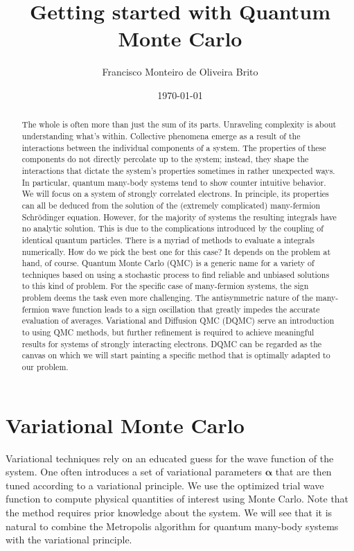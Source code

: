 \documentclass[10pt]{article}
\begin{document}
\title{Getting started with Quantum Monte Carlo}
\author{Francisco Monteiro de Oliveira Brito}
\date{\today}
\maketitle

\begin{abstract}
The whole is often more than just the sum of its parts. Unraveling complexity is about understanding what's within. Collective phenomena emerge as a result of the interactions between the individual components of a system. The properties of these components do not directly percolate up to the system; instead, they shape the interactions that dictate the system's properties sometimes in rather  unexpected ways. In particular, quantum many-body systems tend to show counter intuitive behavior. We will focus on a system of strongly correlated electrons. In principle, its properties can all be deduced from the solution of the (extremely complicated) many-fermion Schr\"odinger equation. However, for the majority of systems the resulting integrals have no analytic solution. This is due to the complications introduced by the coupling of identical quantum particles. There is a myriad of methods to evaluate a integrals numerically. How do we pick the best one for this case? It depends on the problem at hand, of course. Quantum Monte Carlo (QMC) is a generic name for a variety of techniques based on using a stochastic process to find reliable and unbiased solutions to this kind of problem. For the specific case of many-fermion systems, the sign problem deems the task even more challenging. The antisymmetric nature of the many-fermion wave function leads to a sign oscillation that greatly impedes the accurate evaluation of averages. Variational and Diffusion QMC (DQMC) serve an introduction to using QMC methods, but further refinement is required to achieve meaningful results for systems of strongly interacting electrons. DQMC can be regarded as the canvas on which we will start painting a specific method that is optimally adapted to our problem.
\end{abstract}

\section{Variational Monte Carlo}

Variational techniques rely on an educated guess for the wave function of the system. One often introduces a set of variational parameters $\bm \alpha$ that are then tuned according to a variational principle. We use the optimized trial wave function to compute physical quantities of interest using Monte Carlo. Note that the method requires  prior knowledge about the system. We will see that it is natural to combine the Metropolis algorithm for quantum many-body systems with the variational principle.
\end{document}
